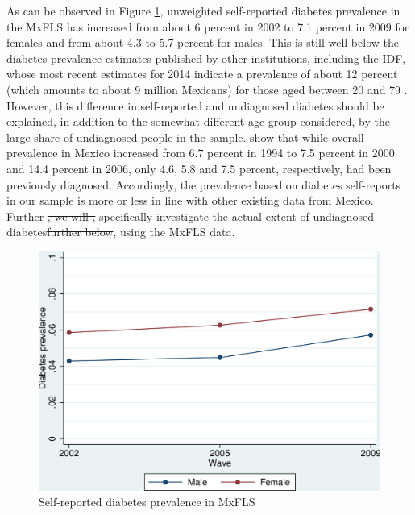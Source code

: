 \documentclass[12pt,english,british]{article}
\providecommand{\DIFaddtex}[1]{{\protect\color{blue}\uwave{#1}}} %
\providecommand{\DIFdeltex}[1]{{\protect\color{red}\sout{#1}}}                      %
\providecommand{\DIFaddbegin}{} %
\providecommand{\DIFaddend}{} %
\providecommand{\DIFdelbegin}{} %
\providecommand{\DIFdelend}{} %
\providecommand{\DIFadd}[1]{\texorpdfstring{\DIFaddtex{#1}}{#1}} %
\providecommand{\DIFdel}[1]{\texorpdfstring{\DIFdeltex{#1}}{}} %
\begin{document}
As can be observed in Figure \ref{fig:Self-reported-diabetes-prevalenc},
unweighted self-reported diabetes prevalence in the \ac{MxFLS}
has increased from about 6 percent in 2002 to 7.1 percent in 2009
for females and from about 4.3 to 5.7 percent for males. This is
still well below the diabetes prevalence estimates published by other
institutions, including the \ac{IDF}, whose most recent estimates for 2014 indicate a prevalence of about 12 percent (which amounts to about 9 million Mexicans) for those aged between 20 and 79 \citep{InternationalDiabetesFederation2013}.
However, this difference in self-reported and undiagnosed diabetes should be explained, in addition to the somewhat different age group considered, by the large share of undiagnosed people in the sample. \citet{Barquera2013} show that while overall prevalence in Mexico increased from 6.7 percent in 1994 to 7.5 percent in 2000 and 14.4 percent in 2006, only 4.6, 5.8 and 7.5 percent, respectively, had been previously diagnosed. Accordingly, the prevalence based on diabetes self-reports in our sample is more or less in line with other existing data from Mexico. Further \DIFdelbegin \DIFdel{, we will , }\DIFdelend \DIFaddbegin \DIFadd{below we will }\DIFaddend specifically investigate the actual extent of undiagnosed diabetes\DIFdelbegin \DIFdel{further below}\DIFdelend , using the \ac{MxFLS} data.

\begin{figure}[h!]
\begin{center}
\includegraphics[width=0.7\columnwidth]{figures/diabetes_prevalence1/diabetes_prevalence1}
\end{center}
\caption{\label{fig:Self-reported-diabetes-prevalenc}Self-reported diabetes
prevalence in MxFLS}
\end{figure}
\end{document}
